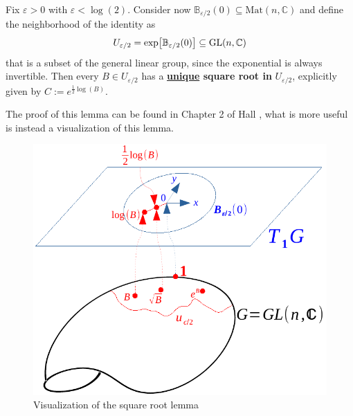 \documentclass[../main.tex]{subfiles}
\begin{document}
\begin{lemma}
Fix $\varepsilon>0$ with $\varepsilon<\log(2)$. Consider now $\mathbb{B}_{\varepsilon/2}(0)\subseteq\text{Mat}(n,\mathbb{C})$ and define the neighborhood of the identity as
\[
{\color{black}U_{\varepsilon/2}=\exp[\mathbb{B}_{\varepsilon/2}(0)]\subseteq\text{GL}(n,\mathbb{C})}
\]
that is a subset of the general linear group, since the exponential is always invertible. Then every {\color{black}$B\in U_{\varepsilon/2}$} has a \textbf{\underline{unique} square root in} $U_{\varepsilon/2}$, explicitly given by {\color{black}$C:=e^{\frac{1}{2}\log(B)}$}.
\end{lemma}
The proof of this lemma can be found in Chapter 2 of Hall \cite{Hall2015}, what is more useful is instead a visualization of this lemma.
\begin{figure}[h!]
    \centering
    \includegraphics{images/square_root_vis.pdf}
    \caption{Visualization of the square root lemma}
\end{figure}
\end{document}
